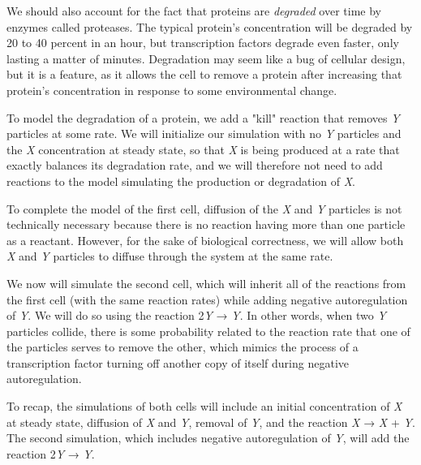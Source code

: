 We should also account for the fact that proteins are \textit{degraded} over time by enzymes called proteases. The typical protein's concentration will be degraded by 20 to 40 percent in an hour, but transcription factors degrade even faster, only lasting a matter of minutes. Degradation may seem like a bug of cellular design, but it is a feature, as it allows the cell to remove a protein after increasing that protein's concentration in response to some environmental change.

To model the degradation of a protein, we add a "kill" reaction that removes \textit{Y} particles at some rate. We will initialize our simulation with no \textit{Y} particles and the \textit{X} concentration at steady state, so that \textit{X} is being produced at a rate that exactly balances its degradation rate, and we will therefore not need to add reactions to the model simulating the production or degradation of \textit{X}.

To complete the model of the first cell, diffusion of the \textit{X} and \textit{Y} particles is not technically necessary because there is no reaction having more than one particle as a reactant. However, for the sake of biological correctness, we will allow both \textit{X} and \textit{Y} particles to diffuse through the system at the same rate.

\begin{qbox}\end{qbox} 

We now will simulate the second cell, which will inherit all of the reactions from the first cell (with the same reaction rates) while adding negative autoregulation of \textit{Y}. We will do so using the reaction 2\textit{Y} → \textit{Y}. In other words, when two \textit{Y} particles collide, there is some probability related to the reaction rate that one of the particles serves to remove the other, which mimics the process of a transcription factor turning off another copy of itself during negative autoregulation.

To recap, the simulations of both cells will include an initial concentration of \textit{X} at steady state, diffusion of \textit{X} and \textit{Y}, removal of \textit{Y}, and the reaction \textit{X} → \textit{X} + \textit{Y}. The second simulation, which includes negative autoregulation of \textit{Y}, will add the reaction 2\textit{Y} → \textit{Y}. 

